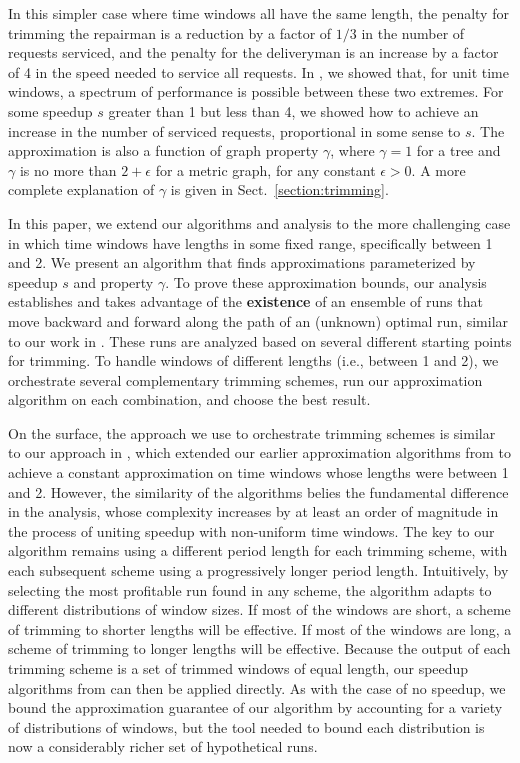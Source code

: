 \documentclass[11pt]{article}
\begin{document}
In this simpler case where time windows all have the same length, the penalty for trimming the repairman is a reduction by a factor of $1/3$ in the number of requests serviced, 
and the penalty for the deliveryman is an increase by a factor of 4 in the speed needed to service all requests.
In \cite{Frederickson5}, we showed that, for unit time windows, a spectrum of performance is possible between these two extremes.
For some speedup $s$ greater than 1 but less than 4, we showed how to achieve an increase in the number of serviced requests,
proportional in some sense to $s$.  The approximation is also a function of graph property $\gamma$, where $\gamma = 1$ for a tree and $\gamma$ is no more than $2 + \epsilon$ for a metric graph, for any constant $\epsilon > 0$.  A more complete explanation of $\gamma$ is given in Sect.~\ref{section:trimming}.

In this paper, we extend our algorithms and analysis to the more challenging case in which time windows have lengths in some fixed range, specifically between 1 and 2.
We present an algorithm that finds approximations parameterized by speedup $s$ and property $\gamma$.
To prove these approximation bounds, our analysis establishes and takes advantage of the \textbf{existence} of an ensemble of runs that move backward and forward along the path of an (unknown) optimal run, similar to our work in \cite{Frederickson5}.  These runs are analyzed based on several different starting points for trimming.  To handle windows of different lengths (i.e., between 1 and 2),
we orchestrate several complementary trimming schemes, run our approximation algorithm on each combination,
and choose the best result.

On the surface, the approach we use to orchestrate trimming schemes is similar to our approach in \cite{Frederickson6}, which extended our earlier approximation algorithms from \cite{Frederickson3} to achieve a constant approximation on time windows whose lengths were between 1 and 2.  However, the similarity of the algorithms belies the fundamental difference in the analysis, whose complexity increases by at least an order of magnitude in the process of uniting speedup with non-uniform time windows.  The key to our algorithm remains using a different period length for each trimming scheme, with each subsequent scheme using a progressively longer period length.  Intuitively, by selecting the most profitable run found in any scheme, the algorithm adapts to different distributions of window sizes.  If most of the windows are short, a scheme of trimming to shorter lengths will be effective.  If most of the windows are long, a scheme of trimming to longer lengths will be effective.  Because the output of each trimming scheme is a set of trimmed windows of equal length, our speedup algorithms from \cite{Frederickson5} can then be applied directly.  As with the case of no speedup, we bound the approximation guarantee of our algorithm by  accounting for a variety of distributions of windows, but the tool needed to bound each distribution is now a considerably richer set of hypothetical runs.
\end{document}
